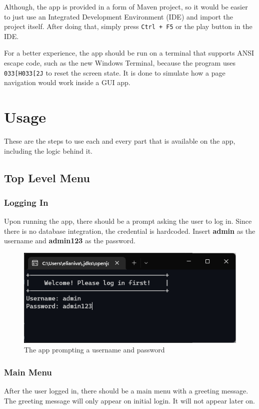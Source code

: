 \documentclass[12pt,titlepage]{article}
\begin{document}
Although, the app is provided in a form of Maven project, so it would be easier to just use an Integrated Development Environment (IDE) and import the project itself.
After doing that, simply press \texttt{Ctrl + F5} or the play button in the IDE.

For a better experience, the app should be run on a terminal that supports ANSI escape code, such as the new Windows Terminal,
because the program uses \texttt{033[H033[2J} to reset the screen state.
It is done to simulate how a page navigation would work inside a GUI app.

\section{Usage}
These are the steps to use each and every part that is available on the app, including the logic behind it.

\subsection{Top Level Menu}
\subsubsection{Logging In}
Upon running the app, there should be a prompt asking the user to log in. Since there is no database integration, the credential is hardcoded.
Insert \textbf{admin} as the username and \textbf{admin123} as the password.

\begin{figure}[h]
    \centering
    \includegraphics[width=.7\textwidth]{images/login.png}
    \caption{The app prompting a username and password}
\end{figure}

\subsubsection{Main Menu}
After the user logged in, there should be a main menu with a greeting message. The greeting message will only appear on initial login.
It will not appear later on.
\end{document}
